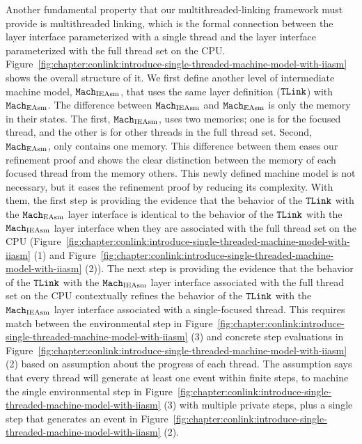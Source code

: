 Another fundamental property that our multithreaded-linking framework must provide is multithreaded linking, which is the formal connection 
between the layer interface parameterized with a single thread and 
the layer interface parameterized with the full thread set on the CPU.
Figure~\ref{fig:chapter:conlink:introduce-single-threaded-machine-model-with-iiasm} shows the overall structure
of it.
We first define another level of intermediate machine model, ${\mathrm{\texttt{Mach}}}_{\mathrm{IEAsm}}$, that uses the same layer definition (${{\mathrm{\texttt{TLink}}}}$) with ${\mathrm{\texttt{Mach}}}_{\mathrm{EAsm}}$.
The difference between  ${\mathrm{\texttt{Mach}}}_{\mathrm{IEAsm}}$ and  ${\mathrm{\texttt{Mach}}}_{\mathrm{EAsm}}$ is only  the memory in their states. 
The first, ${\mathrm{\texttt{Mach}}}_{\mathrm{IEAsm}}$, uses two memories; one is for the focused thread, and the other is for other threads in the full thread set.
Second, ${\mathrm{\texttt{Mach}}}_{\mathrm{EAsm}}$, only contains one memory.
This difference between them eases our refinement proof and  shows the clear distinction between the memory of each focused thread from the memory  others. 
This newly defined machine model is not necessary, but it eases the refinement proof by reducing its complexity.
With them,
the first step is providing the evidence that
the behavior of the ${{\mathrm{\texttt{TLink}}}}$ with the ${\mathrm{\texttt{Mach}}}_{\mathrm{EAsm}}$ layer interface is identical
to the   behavior of the ${{\mathrm{\texttt{TLink}}}}$ with the ${\mathrm{\texttt{Mach}}}_{\mathrm{IEAsm}}$ layer interface when they are associated with the full thread set on the CPU
(Figure~\ref{fig:chapter:conlink:introduce-single-threaded-machine-model-with-iiasm}  (1) and 
Figure~\ref{fig:chapter:conlink:introduce-single-threaded-machine-model-with-iiasm}  (2)).
The next step is 
providing the evidence that 
the behavior of the ${{\mathrm{\texttt{TLink}}}}$ with the ${\mathrm{\texttt{Mach}}}_{\mathrm{IEAsm}}$ layer interface associated with the full thread set on the CPU
contextually refines
the behavior of the ${{\mathrm{\texttt{TLink}}}}$ with the ${\mathrm{\texttt{Mach}}}_{\mathrm{IEAsm}}$ layer interface associated with a single-focused thread.
This requires  match between the environmental step in Figure~\ref{fig:chapter:conlink:introduce-single-threaded-machine-model-with-iiasm}  (3) and concrete step evaluations in  Figure~\ref{fig:chapter:conlink:introduce-single-threaded-machine-model-with-iiasm}  (2)
based on  assumption about the progress of each thread. 
The assumption says that 
every thread will generate at least one event within finite steps,
to machine the  single environmental step in Figure~\ref{fig:chapter:conlink:introduce-single-threaded-machine-model-with-iiasm}  (3)  with multiple private steps, plus a single step that generates an event in  Figure~\ref{fig:chapter:conlink:introduce-single-threaded-machine-model-with-iiasm}  (2).

